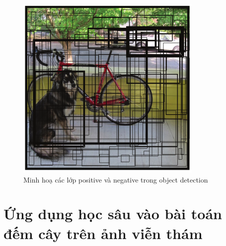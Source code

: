 \documentclass[a4paper, 12pt]{report}
\begin{document}
\begin{figure}[!h]
	\centering
	\includegraphics[width=0.5\linewidth]{Images/dog_bike}
	\caption{Minh hoạ các lớp positive và negative trong object detection}
	\label{fig:pos-neg}
\end{figure} 




\chapter{Ứng dụng học sâu vào bài toán đếm cây trên ảnh viễn thám}
\end{document}
